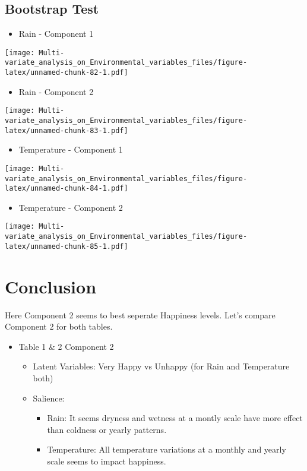 \documentclass[]{book}
\providecommand{\tightlist}{%
  \setlength{\itemsep}{0pt}\setlength{\parskip}{0pt}}
\begin{document}
\hypertarget{bootstrap-test-4}{%
\subsection{Bootstrap Test}\label{bootstrap-test-4}}

\begin{itemize}
\tightlist
\item
  Rain - Component 1
\end{itemize}

\texttt{[image: Multi-variate\_analysis\_on\_Environmental\_variables\_files/figure-latex/unnamed-chunk-82-1.pdf]}

\begin{itemize}
\tightlist
\item
  Rain - Component 2
\end{itemize}

\texttt{[image: Multi-variate\_analysis\_on\_Environmental\_variables\_files/figure-latex/unnamed-chunk-83-1.pdf]}

\begin{itemize}
\tightlist
\item
  Temperature - Component 1
\end{itemize}

\texttt{[image: Multi-variate\_analysis\_on\_Environmental\_variables\_files/figure-latex/unnamed-chunk-84-1.pdf]}

\begin{itemize}
\tightlist
\item
  Temperature - Component 2
\end{itemize}

\texttt{[image: Multi-variate\_analysis\_on\_Environmental\_variables\_files/figure-latex/unnamed-chunk-85-1.pdf]}

\hypertarget{conclusion-4}{%
\section{Conclusion}\label{conclusion-4}}

Here Component 2 seems to best seperate Happiness levels. Let's compare
Component 2 for both tables.

\begin{itemize}
\tightlist
\item
  Table 1 \& 2 Component 2

  \begin{itemize}
  \tightlist
  \item
    Latent Variables: Very Happy vs Unhappy (for Rain and Temperature
    both)
  \item
    Salience:

    \begin{itemize}
    \tightlist
    \item
      Rain: It seems dryness and wetness at a montly scale have more
      effect than coldness or yearly patterns.
    \item
      Temperature: All temperature variations at a monthly and yearly
      scale seems to impact happiness.
    \end{itemize}
  \end{itemize}
\end{itemize}
\end{document}
